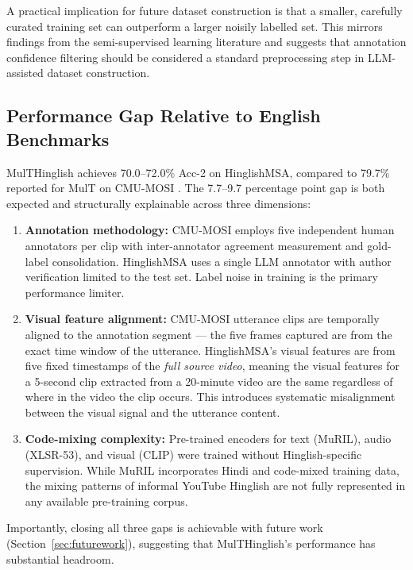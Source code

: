 A practical implication for future dataset construction is that a smaller, carefully curated training set can outperform a larger noisily labelled set. This mirrors findings from the semi-supervised learning literature \cite{brown2020gpt3} and suggests that annotation confidence filtering should be considered a standard preprocessing step in LLM-assisted dataset construction.

\subsection{Performance Gap Relative to English Benchmarks}

MulTHinglish achieves 70.0--72.0\% Acc-2 on HinglishMSA, compared to 79.7\% reported for MulT on CMU-MOSI \cite{tsai2019multimodal}. The 7.7--9.7 percentage point gap is both expected and structurally explainable across three dimensions:

\begin{enumerate}
    \item \textbf{Annotation methodology:} CMU-MOSI employs five independent human annotators per clip with inter-annotator agreement measurement and gold-label consolidation. HinglishMSA uses a single LLM annotator with author verification limited to the test set. Label noise in training is the primary performance limiter.

    \item \textbf{Visual feature alignment:} CMU-MOSI utterance clips are temporally aligned to the annotation segment --- the five frames captured are from the exact time window of the utterance. HinglishMSA's visual features are from five fixed timestamps of the \textit{full source video}, meaning the visual features for a 5-second clip extracted from a 20-minute video are the same regardless of where in the video the clip occurs. This introduces systematic misalignment between the visual signal and the utterance content.

    \item \textbf{Code-mixing complexity:} Pre-trained encoders for text (MuRIL), audio (XLSR-53), and visual (CLIP) were trained without Hinglish-specific supervision. While MuRIL incorporates Hindi and code-mixed training data, the mixing patterns of informal YouTube Hinglish are not fully represented in any available pre-training corpus.
\end{enumerate}

Importantly, closing all three gaps is achievable with future work (Section~\ref{sec:futurework}), suggesting that MulTHinglish's performance has substantial headroom.

